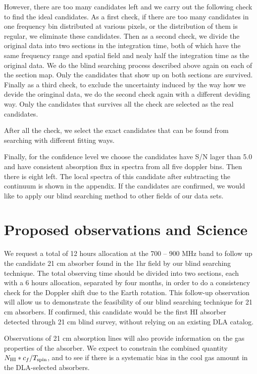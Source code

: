 \documentclass[prl,twocolumn,floatfix,superscriptaddress,nofootinbib,aps]{revtex4}
\begin{document}
However, there are too many candidates left and we carry out the following check to find the ideal candidates. As a first check, if there are too many candidates in one frequency bin distributed at various pixels, or the distribution of them is regular, we eliminate these candidates. Then as a second check, we divide the original data into two sections in the integration time, both of which have the same frequency range and spatial field and nealy half the integration time as the original data. We do the blind searching process described above again on each of the section map. Only the candidates that show up on both sections are survived. Finally as a third check, to exclude the uncertainty induced by the way how we devide the oringinal data, we do the second check again with a different deviding way. Only the candidates that survives all the check are selected as the real candidates.

After all the check, we select the exact candidates that can be found from searching with different fitting ways.

Finally, for the confidence level we choose the candidates have S/N lager than 5.0 and have consistent absorption flux in spectra from all five doppler bins. Then there is eight left. The local spectra of this candidate after subtracting the continuum is shown in the appendix.
If the candidates are confirmed, we would like to apply our blind searching method
to other fields of our data sets.



\section{Proposed observations and Science}
We request a total of 12 hours allocation at the 700 -- 900 MHz band to follow up the candidate 21 cm absorber found in the 1hr field by our blind searching 
technique. The total observing time should be divided into two sections, each with a 6 hours allocation, separated by four months, in order to do a 
consistency check for the Doppler shift due to the Earth rotation. 
This follow-up observation will allow us to demonstrate the feasibility of our 
blind searching technique for 21 cm absorbers. If confirmed, this candidate 
would be the first HI absorber detected through 21 cm blind survey, without 
relying on an existing DLA catalog. 

Observations of 21 cm absorption lines will also provide information on the gas
properties of the absorber. We expect to constrain the combined quantity 
$N_{\rm HI}*c_f/T_{\rm spin}$, and to see if there is a systematic bias in the 
cool gas amount in the DLA-selected absorbers.
\end{document}
